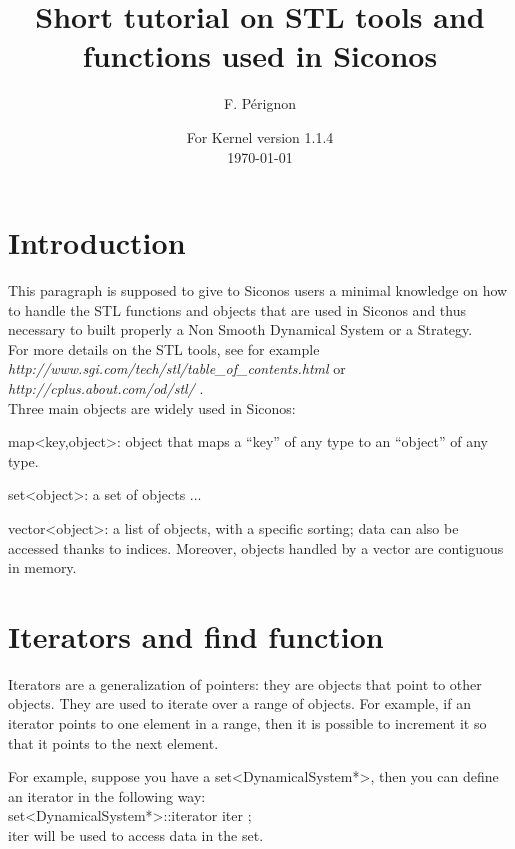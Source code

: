 \documentclass[10pt]{article}
\begin{document}
\thispagestyle{empty}
\title{Short tutorial on STL tools and functions used in Siconos}
\author{F. P\'erignon}

\date{For Kernel version 1.1.4 \\
 \today}
\maketitle

\pagestyle{fancy}

\section{Introduction}
This paragraph is supposed to give to Siconos users a minimal knowledge on how to handle the STL functions and objects that are used in Siconos and thus necessary
to built properly a Non Smooth Dynamical System or a Strategy. \\
For more details on the STL tools, see for example \textit{http://www.sgi.com/tech/stl/table\_of\_contents.html} or \textit{ http://cplus.about.com/od/stl/ }. \\
Three main objects are widely used in Siconos:
\bei
\item map<key,object>: object that maps a ``key'' of any type to an ``object'' of any type. 
\item set<object>: a set of objects ...
\item vector<object>: a list of objects, with a specific sorting; data can also be accessed thanks to indices. Moreover, objects handled by a vector are contiguous in memory.
\ei

\section{Iterators and find function}\label{ItAndFind}

Iterators are a generalization of pointers: they are objects that point to other objects. They are used to iterate over a range of objects.
For example, if an iterator points to one element in a range, then it is possible to increment it so that it points to the next element. 

For example, suppose you have a set<DynamicalSystem*>, then you can define an iterator in the following way: \\
set<DynamicalSystem*>::iterator iter ; \\
iter will be used to access data in the set. \\
\end{document}
